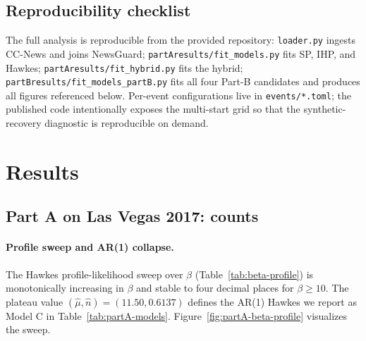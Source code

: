 \documentclass[11pt]{article}
\begin{document}
\subsection{Reproducibility checklist}
\label{sec:repro}

\begin{sloppypar}
The full analysis is reproducible from the provided repository:
\texttt{loader.py} ingests CC-News and joins NewsGuard;
\mbox{\texttt{partAresults/fit\_models.py}} fits SP, IHP, and Hawkes;
\mbox{\texttt{partAresults/fit\_hybrid.py}} fits the hybrid;
\mbox{\texttt{partBresults/fit\_models\_partB.py}} fits all four Part-B
candidates and produces all figures referenced below. Per-event
configurations live in \texttt{events/*.toml}; the published code
intentionally exposes the multi-start grid so that the synthetic-recovery
diagnostic is reproducible on demand.
\end{sloppypar}

\section{Results}
\label{sec:results}

\subsection{Part A on Las Vegas 2017: counts}
\label{sec:results-partA-LV}

\paragraph{Profile sweep and AR(1) collapse.}
The Hawkes profile-likelihood sweep over $\beta$ (Table~\ref{tab:beta-profile})
is monotonically increasing in $\beta$ and stable to four decimal places for
$\beta\geq 10$. The plateau value
$(\hat\mu,\hat n)=(11.50, 0.6137)$ defines the AR(1) Hawkes we report as
Model C in Table~\ref{tab:partA-models}. Figure~\ref{fig:partA-beta-profile}
visualizes the sweep.
\end{document}

